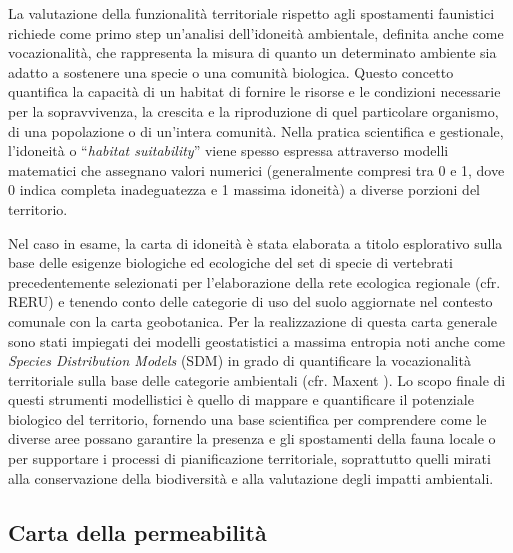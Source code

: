 \documentclass[
  a4paper,
]{book}
\begin{document}
La valutazione della funzionalità territoriale rispetto agli spostamenti faunistici richiede come primo step un'analisi dell'idoneità ambientale, definita anche come vocazionalità, che rappresenta la misura di quanto un determinato ambiente sia adatto a sostenere una specie o una comunità biologica.
Questo concetto quantifica la capacità di un habitat di fornire le risorse e le condizioni necessarie per la sopravvivenza, la crescita e la riproduzione di quel particolare organismo, di una popolazione o di un'intera comunità.
Nella pratica scientifica e gestionale, l'idoneità o ``\emph{habitat suitability}'' viene spesso espressa attraverso modelli matematici che assegnano valori numerici (generalmente compresi tra 0 e 1, dove 0 indica completa inadeguatezza e 1 massima idoneità) a diverse porzioni del territorio.

Nel caso in esame, la carta di idoneità è stata elaborata a titolo esplorativo sulla base delle esigenze biologiche ed ecologiche del set di specie di vertebrati precedentemente selezionati per l'elaborazione della rete ecologica regionale (cfr. RERU) e tenendo conto delle categorie di uso del suolo aggiornate nel contesto comunale con la carta geobotanica.
Per la realizzazione di questa carta generale sono stati impiegati dei modelli geostatistici a massima entropia noti anche come \emph{Species Distribution Models} (SDM) in grado di quantificare la vocazionalità territoriale sulla base delle categorie ambientali (cfr. Maxent \citep{gomesSpeciesDistributionModelling2018}).
Lo scopo finale di questi strumenti modellistici è quello di mappare e quantificare il potenziale biologico del territorio, fornendo una base scientifica per comprendere come le diverse aree possano garantire la presenza e gli spostamenti della fauna locale o per supportare i processi di pianificazione territoriale, soprattutto quelli mirati alla conservazione della biodiversità e alla valutazione degli impatti ambientali.

\subsection{Carta della permeabilità}\label{carta-della-permeabilituxe0}
\end{document}
